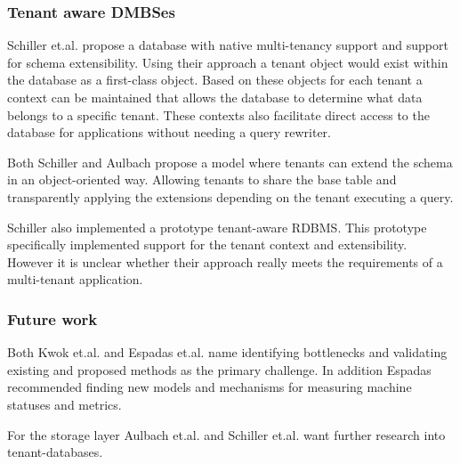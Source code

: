 \subsubsection{Tenant aware DMBSes}
Schiller et.al.\cite{schiller2011native} propose a database with native multi-tenancy support and support for schema extensibility.
Using their approach a tenant object would exist within the database as a first-class object. 
Based on these objects for each tenant a context can be maintained that allows the database to determine what data belongs to a specific tenant. 
These contexts also facilitate direct access to the database for applications without needing a query rewriter.

Both Schiller \cite{schiller2011native} and Aulbach \cite{aulbach2011extensibility} propose a model where tenants can extend the schema in an object-oriented way.
Allowing tenants to share the base table and transparently applying the extensions depending on the tenant executing a query.

Schiller also implemented a prototype tenant-aware RDBMS.
This prototype specifically implemented support for the tenant context and extensibility.
However it is unclear whether their approach really meets the requirements of a multi-tenant application.



\subsubsection{Future work}
Both Kwok et.al. \cite{kwok2008resource} and Espadas et.al.\cite{espadas2013tenant} name identifying bottlenecks and validating existing and proposed methods as the primary challenge.
In addition Espadas recommended finding new models and mechanisms for measuring machine statuses and metrics.

For the storage layer Aulbach et.al. \cite{aulbach2009comparison, aulbach2008multi} and Schiller et.al. \cite{schiller2011native} want further research into tenant-databases.

